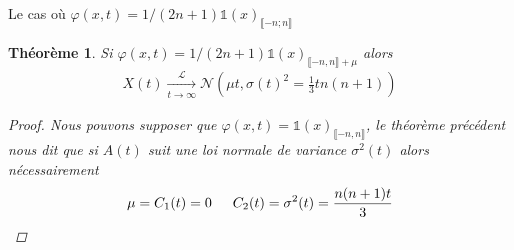 \documentclass{article}
\newtheorem{theorem}{Théorème}[section]
\theoremstyle{definition}
\begin{document}
\begin{section}{Le cas où $\varphi(x, t) = 1/(2n+1)\mathds{1}(x)_{\llbracket -n; n\rrbracket}$}
%
%
%
%
%
%
%
\begin{theorem}
	Si $\varphi(x,t) = 1/(2n+1)\mathds{1}(x)_{\llbracket -n,n\rrbracket+\mu}$ alors
	\begin{align*}
		X(t) \underset{t\to \infty}{\overset{\mathcal{L}}{\to}} \mathcal{N}(\mu t, \sigma(t)^2 = \frac{1}{3}tn(n+1))
	\end{align*}
	\begin{proof}
		Nous pouvons supposer que $\varphi(x,t)=\mathds{1}(x)_{\llbracket -n,n\rrbracket}$, le théorème précédent nous dit que si $A(t)$ suit une loi normale de variance $\sigma^2(t)$ alors nécessairement 
	\begin{align*}
		\mu = C_1(t) = 0 \indent C_2(t) = \sigma^2(t)  = \frac{n(n+1)t}{3}
	\end{align*}


\end{proof}
\end{theorem}
\end{section}
\end{document}
